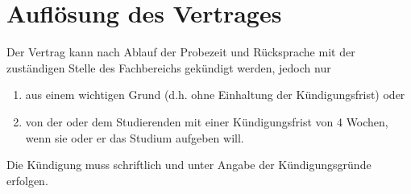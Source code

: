 \section{Auflösung des Vertrages}

Der Vertrag kann nach Ablauf der Probezeit und Rücksprache mit der zuständigen Stelle des Fachbereichs \departement gekündigt werden, jedoch nur
\begin{enumerate}
	\item aus einem wichtigen Grund (d.h. ohne Einhaltung der Kündigungsfrist) oder
	\item von der oder dem Studierenden mit einer Kündigungsfrist von 4 Wochen, wenn sie oder er das Studium aufgeben will.
\end{enumerate}

Die Kündigung muss schriftlich und unter Angabe der Kündigungsgründe erfolgen.

